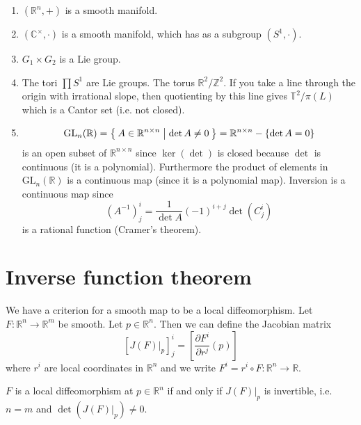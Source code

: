 \begin{xmpl}
  \begin{enumerate}
    \item{
      $(\mathbb{R}^n, +)$ is a smooth manifold.
    }
    \item{
      $(\mathbb{C}^\times, \cdot)$ is a smooth manifold, which has as
      a subgroup $(S^1, \cdot)$.
    }
    \item{
      $G_1 \times G_2$ is a Lie group.
    }
    \item{
      The tori $\prod S^1$ are Lie groups.
      The torus $\mathbb{R}^2 / \mathbb{Z}^2$. If you take a line
      through the origin with irrational slope, then quotienting by
      this line gives $\mathbb{T}^2 / \pi(L)$ which is a Cantor set
      (i.e. not closed).
    }
    \item{
      $$
        \mathrm{GL}_n(\mathbb{R})
      = \Set{ A \in \mathbb{R}^{n \times n} | \det A \neq 0 }
      = \mathbb{R}^{n \times n} - \{ \det A = 0 \}
      $$
      is an open subset of $\mathbb{R}^{n \times n}$ since
      $\ker(\det)$ is closed because $\det$ is continuous (it is a
      polynomial). Furthermore the product of elements in
      $\mathrm{GL}_n(\mathbb{R})$ is a continuous map (since it is a
      polynomial map). Inversion is a continuous map since
      $$
        (A^{-1})^i_j
      = \frac{1}{\det A} (-1)^{i + j} \det(C^i_j)
      $$
      is a rational function (Cramer's theorem).
    }
  \end{enumerate}
\end{xmpl}

\section{Inverse function theorem}
We have a criterion for a smooth map to be a local diffeomorphism.
Let $F : \mathbb{R}^n \to \mathbb{R}^m$ be smooth. Let $p \in
\mathbb{R}^n$. Then we can define the Jacobian matrix
$$
[J(F)|_p]^i_j = \left[\frac{\partial F^i}{\partial r^j}(p)\right]
$$
where $r^i$ are local coordinates in $\mathbb{R}^n$ and we
write $F^i = r^i \circ F : \mathbb{R}^n \to \mathbb{R}$.

\begin{theorem}
$F$ is a local diffeomorphism at $p \in \mathbb{R}^n$ if and only if
$J(F)|_p$ is invertible, i.e. $n = m$ and $\det(J(F)|_p) \neq 0$.
\end{theorem}

